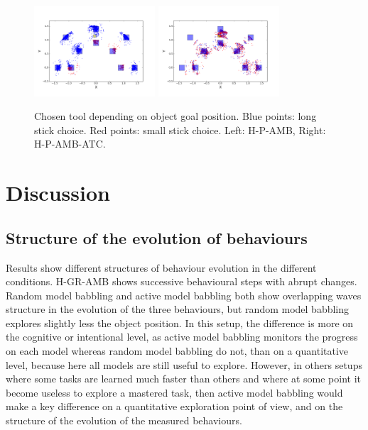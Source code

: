 \documentclass[10pt,letterpaper]{article}
\begin{document}
		\begin{figure}[ht]
			\centering
			\includegraphics[width=4.5cm]{./include/H-RGB-P-AMB-log9-choice_mod4.png}
			\hspace{-0.6cm}
			\includegraphics[width=4.5cm]{./include/H-RGB-P-AMB-PGITC-log3-choice_mod4.png}
			\caption{Chosen tool depending on object goal position. Blue points: long stick choice. Red points: small stick choice. Left: H-P-AMB, Right: H-P-AMB-ATC.}
			\label{res_choice}
		\end{figure}
		
	
%


\section{Discussion}

	\subsection{Structure of the evolution of behaviours}
	
		Results show different structures of behaviour evolution in the different conditions.
		H-GR-AMB shows successive behavioural steps with abrupt changes.
		Random model babbling and active model babbling both show overlapping waves structure in the evolution of the three behaviours, 
		but random model babbling explores slightly less the object position.
		In this setup, the difference is more on the cognitive or intentional level, as active model babbling monitors the progress on each model whereas random model babbling do not, than on a quantitative level, 
		because here all models are still useful to explore.
		However, in others setups where some tasks are learned much faster than others and where at some point it become useless to explore a mastered task, then active model babbling would
		make a key difference on a quantitative exploration point of view, and on the structure of the evolution of the measured behaviours.
	
\end{document}

